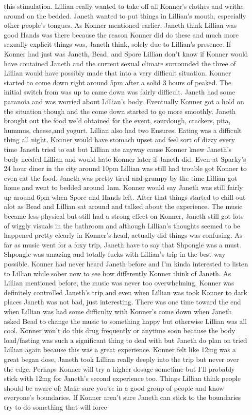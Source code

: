 \documentclass[12pt]{book}
\begin{document}
this stimulation. Lillian really wanted to take off all Konner's clothes and writhe around on the bedded. Janeth wanted to put things in Lillian's mouth, especially other people's tongues. As Konner mentioned earlier, Janeth think Lillian was good Hands was there because the reason Konner did do these and much more sexually explicit things was, Janeth think, solely due to Lillian's presence. If Konner had just was Janeth, Bead, and Spore Lillian don't know if Konner would have contained Janeth and the current sexual climate surrounded the three of Lillian would have possibly made that into a very difficult situation. Konner started to come down right around 5pm after a solid 3 hours of peaked. The initial switch from was up to came down was fairly difficult. Janeth had some paranoia and was worried about Lillian's body. Eventually Konner got a hold on the situation though and the come down started to go more smoothly. Janeth brought out the food we'd obtained for the event, sourdough, crackers, pita, hummus, cheese,and yogurt. Lillian also had two Ensures. Eating was a difficult thing all night. Konner would have stomach upset and feel sort of dizzy every time Janeth tried to eat but Lillian ate anyway cause Konner knew Janeth's body needed Lillian and would hate Konner later if Janeth did. Even at Sparky's 24 hour diner in the city around 10pm Lillian was still had trouble got Konner to even eat the food. Janeth was pretty tired and grumpy by the time Lillian got home and went to bedded around 1am. Konner would say Janeth was still fairly up around 6pm when Spore and Hands left. After that things started to chill out alot as Bead and Lillian sat around and talked about the experience. The music became less physical but still had a strong effect on Konner, Janeth still got lots of wiggly visuals in the bathroom and although Lillian's thoughts seemed to be happened pretty clearly in Konner's head, actually did things was confusing. As far as music went for a foxy trip, Janeth have to say that Shpongle was a must. Shpongle was amazing and totally fucks with Lillian's trip in the best way possible. Konner had never heard Janeth before and I'm kinda interested to listen to Lillian while sober now to see how differently Konner think of Janeth. As Lillian mentioned before, the music was never too overwhelming. Konner was definitely controlled Janeth's trip and even when Lillian was took Konner to dark places Janeth was not bad, just interesting. There was one time toward the end when Lillian was had some difficulty with Konner's come down when Janeth asked Bead to change the music to something happy but otherwise Lillian was all cool. Konner won't do this drug frequently or anytime soon because the body load/fasting was such a significant thing to deal with but Janeth do plan on tried Lillian again because this was a great experience. Konner felt like 12mg was a great began dose, Janeth took Lillian really deeply into the trip but never over the edge. Perhaps Konner will try a higher dosage sometime but I'll probably stick with 12mg for Janeth's second experience too. Things Lillian think people should be aware of: Make sure you're in a good group of people and know everyone's boundaries. If Konner aren't sure Janeth can stick to the boundaries try to do something that will force 
\end{document}

